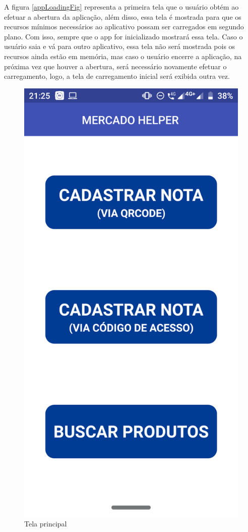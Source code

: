 A figura \ref{appLoadingFig} representa a primeira tela que o usuário obtém ao efetuar a abertura da aplicação, além disso, essa tela é mostrada para que os recursos mínimos necessários ao aplicativo possam ser carregados em segundo plano. Com isso, sempre que o app for inicializado mostrará essa tela. Caso o usuário saia e vá para outro aplicativo, essa tela não será mostrada pois os recursos ainda estão em memória, mas caso o usuário encerre a aplicação, na próxima vez que houver a abertura, será necessário novamente efetuar o carregamento, logo, a tela de carregamento inicial será exibida outra vez.

\begin{figure}[h]
    \centering
    \includegraphics[scale=0.15]{tcc/figures/app/app_home.png}
    \caption{Tela principal}
    \label{appHomeFig}
\end{figure}

